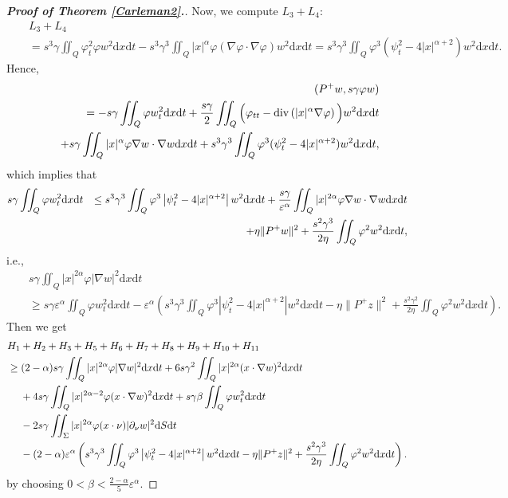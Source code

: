 \documentclass[11pt]{article}
\numberwithin{equation}{section}
\def\pt{\partial}
\def\e{\varepsilon }
\def\vp{\varphi}
\def\bf{\textbf}
\def\pt{\partial}
\def\al{\alpha}
\def\be{\beta}
\def\ga{\gamma}
\def\f{\frac}
\def\df{\mathrm d}
\DeclareMathOperator{\Div}{div}
\begin{document}
\begin{proof}[{\rm \bf { Proof of  Theorem \ref{Carleman2}.}}]
			Now, we compute $L_3+L_4$:
			\begin{eqnarray*}
				&&L_3+L_4\\
				&&=s^3\ga \iint_Q \vp_t^2\vp w^2\df x\df t-s^3\ga^3 \iint_Q |x|^\al \vp (\nabla\vp\cdot \nabla\vp) w^2\df x\df t=s^3\ga^3\iint_Q \vp^3(\psi_t^2-4|x|^{\al+2})w^2\df x\df t.
			\end{eqnarray*}
			Hence,
			\begin{eqnarray*}
				&&(P^+w, s\ga \vp w)\\
				&&=-s\ga\iint_Q\vp w_t^2\df x\df t+\f{s\ga }{2}\iint_Q \Big(\vp_{tt}-\Div\left(|x|^\al \nabla \vp\right)\Big)w^2\df x\df t\\
				&&\hspace{4.5mm} +s\ga\iint_Q|x|^\al \vp \nabla w\cdot \nabla w\df x\df t +s^3\ga^3\iint_Q \vp^3(\psi_t^2-4|x|^{\al+2})w^2\df x\df t,
			\end{eqnarray*}
			which implies that
			\begin{eqnarray*}
				s\ga \iint_Q\vp w_t^2\df x\df t
				&&\leq s^3\ga^3\iint_Q\vp^3\left|\psi_t^2-4|x|^{\al+2}\right| w^2\df x\df t+\f{s\ga}{\e^{\al}}\iint_Q |x|^{2\al}\vp\nabla w\cdot \nabla w\df x\df t\\
				&&\hspace{4.5mm}+\eta\|P^+w\|^2+\f{s^2\ga^3}{2\eta}\iint_Q  \vp^2w^2\df x\df t,
			\end{eqnarray*}
			i.e.,
			\begin{eqnarray*}
				&& s\ga \iint_Q|x|^{2\al}\vp|\nabla w|^2\df x\df t\\
				&&\geq s\ga \e^\al \iint_Q\vp w_t^2\df x\df t-\e^\al\left(s^3\ga^3\iint_Q\vp^3\left|\psi_t^2-4|x|^{\al+2}\right|w^2\df x\df t-\eta\|P^+z\|^2+\f{s^2\ga^2}{2\eta}\iint_Q\vp^2w^2\df x\df t\right).
			\end{eqnarray*}
			Then we get
			\begin{equation*}
				\begin{split}
					& H_1+H_2+H_3+H_5+H_6+H_7+H_8+H_9+H_{10}+H_{11}\\
					&\geq (2-\alpha)s\ga \iint_Q|x|^{2\al}\vp |\nabla w|^2\df x\df t+6s\ga^2\iint_Q|x|^{2\al}(x\cdot \nabla w)^2\df x\df t\\
					&\hspace{4.5mm}+4s\ga\iint_Q|x|^{2\al-2}\vp (x\cdot \nabla w)^2\df x\df t +s\ga \be\iint_Q\vp w_t^2\df x\df t\\
					&\hspace{4.5mm}-2s\ga \iint_\Sigma |x|^{2\al}  \vp (x\cdot \nu)|\pt_\nu w|^2\df S\df t\\
					&\hspace{4.5mm}-(2-\alpha)\e^\al\left(s^3\ga^3\iint_Q\vp^3\left|\psi_t^2-4|x|^{\al+2}\right|w^2\df x\df t-\eta\|P^+z\|^2+\f{s^2\ga^3}{2\eta}\iint_Q\vp^2w^2\df x\df t\right).
				\end{split}
			\end{equation*}
			by choosing  $0<\be<\f{2-\alpha}{5}\e^\al$.
			

\end{proof}
\end{document}
